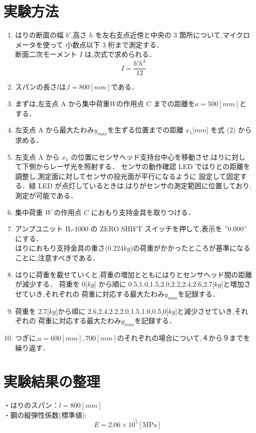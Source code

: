 \documentclass[a4paper,12pt]{jsarticle}
\begin{document}
\section{実験方法}
\begin{enumerate}
  \item はりの断面の幅 $b'$,高さ $h$ を左右支点近傍と中央の 3 箇所について,マイクロメータを使って
  小数点以下 3 桁まで測定する．\\
  \quad 断面二次モーメント $I$ は,次式で求められる．
  \begin{equation}
    I = {\dfrac{b'h^3}{12}}
  \end{equation}
  \item スパンの長さ$ l $は,$l= 800[mm] $である．
  \item まずは,左支点 A から集中荷重$ W $の作用点 C までの距離を$a = 500[mm] $とする．
  \item 左支点 A から最大たわみ$y_{max}$を生ずる位置までの距離 $x_1$[$mm$] を式 (2) から求める．
  \item 左支点 A から $x_1$ の位置にセンサヘッド支持台中心を移動させ,はりに対して下側からレーザ光を照射する．
  センサの動作確認 LED ではりとの距離を調整し,測定面に対してセンサの投光面が平行になるように
  設定して固定する．緑 LED が点灯しているときは,はりがセンサの測定範囲に位置しており,測定が可能である．
  \item  集中荷重 $W$ の作用点 $C$ におもり支持金具を取りつける．
  \item アンプユニット IL-1000 の ZERO SHIFT スイッチを押して,表示を ”0.000” にする．\\
  はりにおもり支持金具の重さ(0.224$kg$)の荷重がかかったところが基準になることに,注意すべきである．
  \item はりに荷重を載せていくと,荷重の増加とともにはりとセンサヘッド間の距離が減少する．
  荷重を 0[$kg$] から順に 0.5,1.0,1.5,2.0,2.2,2.4,2.6,2.7[$kg$]と増加させていき,それぞれの
  荷重に対応する最大たわみ$y_{max}$を記録する．
  \item 荷重を 2.7[$kg$]から順に 2.6,2.4,2.2,2.0,1.5,1.0,0.5,0[$kg$]と減少させていき,それぞれの
  荷重に対応する最大たわみ$y_{max}$を記録する．
  \item つぎに,$a= 600[mm],700[mm]$のそれぞれの場合について,４から９までを繰り返す．
\end{enumerate}

\section{実験結果の整理}
・はりのスパン：$l = 800[mm]$\\
\quad・鋼の縦弾性係数(標準値):
\begin{equation} 
  E = 2.06 \times 10^5 [\text{MPa}]
\end{equation}
\end{document}
